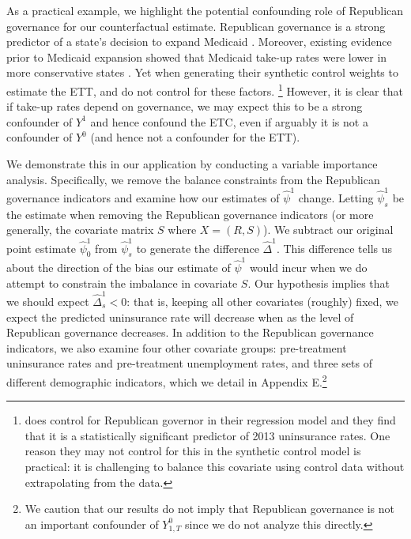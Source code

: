 \documentclass[article]{imsart}
\theoremstyle{plain}
\theoremstyle{remark}
\begin{document}
As a practical example, we highlight the potential confounding role of Republican governance for our counterfactual estimate. Republican governance is a strong predictor of a state's decision to expand Medicaid \cite{courtemanche2017early}. Moreover, existing evidence prior to Medicaid expansion showed that Medicaid take-up rates were lower in more conservative states \cite{sommers2012understanding}. Yet when generating their synthetic control weights to estimate the ETT, \cite{courtemanche2017early} and \cite{kaestner2017effects} do not control for these factors. \footnote{\cite{courtemanche2017early} does control for Republican governor in their regression model and they find that it is a statistically significant predictor of 2013 uninsurance rates. One reason they may not control for this in the synthetic control model is practical: it is challenging to balance this covariate using control data without extrapolating from the data.} However, it is clear that if take-up rates depend on governance, we may expect this to be a strong confounder of $Y^1$ and hence confound the ETC, even if arguably it is not a confounder of $Y^0$ (and hence not a confounder for the ETT).

We demonstrate this in our application by conducting a variable importance analysis. Specifically, we remove the balance constraints from the Republican governance indicators and examine how our estimates of $\hat{\psi}^1$ change. Letting $\hat{\psi}^1_s$ be the estimate when removing the Republican governance indicators (or more generally, the covariate matrix $S$ where $X = (R, S)$). We subtract our original point estimate $\hat{\psi}^1_0$ from $\hat{\psi}^1_s$ to generate the difference $\hat{\Delta}^1$. This difference tells us about the direction of the bias our estimate of $\hat{\psi}^1$ would incur when we do attempt to constrain the imbalance in covariate $S$. Our hypothesis implies that we should expect $\hat{\Delta}_s^1 < 0$: that is, keeping all other covariates (roughly) fixed, we expect the predicted uninsurance rate will decrease when as the level of Republican governance decreases. In addition to the Republican governance indicators, we also examine four other covariate groups: pre-treatment uninsurance rates and pre-treatment unemployment rates, and three sets of different demographic indicators, which we detail in Appendix E.\footnote{We caution that our results do not imply that Republican governance is not an important confounder of $Y^0_{1, T}$ since we do not analyze this directly.} 
\end{document}
